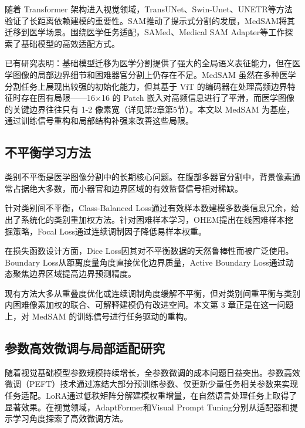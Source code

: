 随着 Transformer 架构进入视觉领域，TransUNet\cite{chen2021transunet}、Swin-Unet\cite{cao2022swinunet}、UNETR\cite{hatamizadeh2022unetr}等方法验证了长距离依赖建模的重要性。SAM\cite{kirillov2023segment}推动了提示式分割的发展，MedSAM\cite{ma2024medsam}将其迁移到医学场景。围绕医学任务适配，SAMed\cite{zhang2024samed}、Medical SAM Adapter\cite{wu2023medsamadapter}等工作探索了基础模型的高效适配方式\cite{mazurowski2023sam_survey}。

已有研究表明：基础模型迁移为医学分割提供了强大的全局语义表征能力，但在医学图像的局部边界细节和困难器官分割上仍存在不足。MedSAM 虽然在多种医学分割任务上展现出较强的初始化能力，但其基于 ViT 的编码器在处理高频边界特征时存在固有局限——16×16 的 Patch 嵌入对高频信息进行了平滑，而医学图像的关键边界往往只有 1-2 像素宽（详见第2章第5节）。本文以 MedSAM 为基座，通过训练信号重构和局部结构补强来改善这些局限。

\subsection{不平衡学习方法}

类别不平衡是医学图像分割中的长期核心问题\cite{litjens2017survey}。在腹部多器官分割中，背景像素通常占据绝大多数，而小器官和边界区域的有效监督信号相对稀缺。

针对类别间不平衡，Class-Balanced Loss\cite{cui2019classbalanced}通过有效样本数建模多数类信息冗余，给出了系统化的类别重加权方法。针对困难样本学习，OHEM\cite{shrivastava2016ohem}提出在线困难样本挖掘策略，Focal Loss\cite{lin2017focal}通过连续调制因子降低易样本权重。

在损失函数设计方面，Dice Loss\cite{milletari2016vnet}因其对不平衡数据的天然鲁棒性而被广泛使用。Boundary Loss\cite{kervadec2019boundary}从距离度量角度直接优化边界质量，Active Boundary Loss\cite{wang2022activeboundaryloss}通过动态聚焦边界区域提高边界预测精度。

现有方法大多从重叠度优化或连续调制角度缓解不平衡，但对类别间重平衡与类别内困难像素加权的联合、可解释建模仍有改进空间。本文第 3 章正是在这一问题上，对 MedSAM 的训练信号进行任务驱动的重构。

\subsection{参数高效微调与局部适配研究}

随着视觉基础模型参数规模持续增长，全参数微调的成本问题日益突出。参数高效微调（PEFT）技术通过冻结大部分预训练参数、仅更新少量任务相关参数来实现任务适配\cite{ding2022peftsurvey}。LoRA\cite{hu2022lora}通过低秩矩阵分解建模权重增量，在自然语言处理任务上取得了显著效果。在视觉领域，AdaptFormer\cite{chen2022adaptformer}和Visual Prompt Tuning\cite{jia2022vpt}分别从适配器和提示学习角度探索了高效微调方法。

